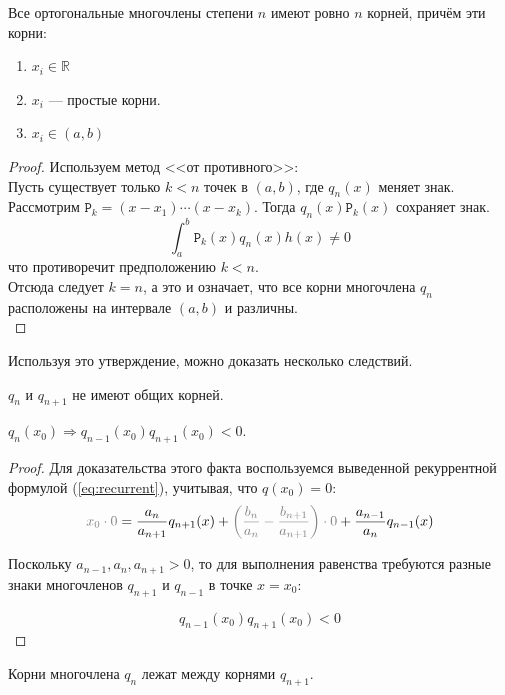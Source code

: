\documentclass[12pt]{article}
\begin{document}
		\begin{state}
			Все ортогональные многочлены степени $n$ имеют ровно $n$ корней, причём эти корни:
			\begin{enumerate}
				\item $x_i \in \mathbb{R}$
				\item $x_i$ --- простые корни.
				\item $x_i \in (a,b)$
			\end{enumerate}
			\begin{proof}
			Используем метод <<от противного>>: \\
			Пусть существует только $k < n$ точек в $(a,b)$, где $q_n(x)$ меняет знак. Рассмотрим 
			$\mathtt{P}_k = (x - x_1) \cdots (x - x_k)$. Тогда $q_n(x) \mathtt{P}_k(x)$ сохраняет знак. 
			$$ \int_a^b \mathtt{P}_k (x) q_n(x) h(x) \neq 0$$
			что противоречит предположению $k < n$. \\
			Отсюда следует $k = n$, а это и означает, что все корни многочлена $q_n$ расположены на интервале $(a,b)$ 
			и различны.\\
			\end{proof}
		\end{state}

		Используя это утверждение, можно доказать несколько следствий.


		\begin{state}
			$q_n$ и $q_{n+1}$ не имеют общих корней.
		\end{state}

		\begin{state}
			$q_n(x_0) \Rightarrow q_{n-1}(x_0) q_{n+1}(x_0) < 0$.
			\begin{proof}
				Для доказательства этого факта воспользуемся выведенной рекуррентной формулой (\ref{eq:recurrent}), учитывая, что $q(x_0) = 0$:
				$$ {\color{gray}x_0 \cdot 0} = 
				\frac{a_n}{a_{n+1}} q_{n+1}(x) + {\color{gray}\left(\frac{b_n}{a_n} - 
				\frac{b_{n+1}}{a_{n+1}}\right) \cdot 0} + \frac{a_{n-1}}{a_n} q_{n-1}(x)$$

				Поскольку $a_{n-1}, a_n, a_{n+1} > 0$, то для выполнения равенства требуются разные знаки многочленов $q_{n+1}$ и $q_{n-1}$ в точке $x=x_0$:

				$$q_{n-1}(x_0) q_{n+1}(x_0) < 0$$
			\end{proof}
		\end{state}

		\begin{state}
			Корни многочлена $q_n$ лежат между корнями $q_{n+1}$.
		\end{state}
\end{document}
